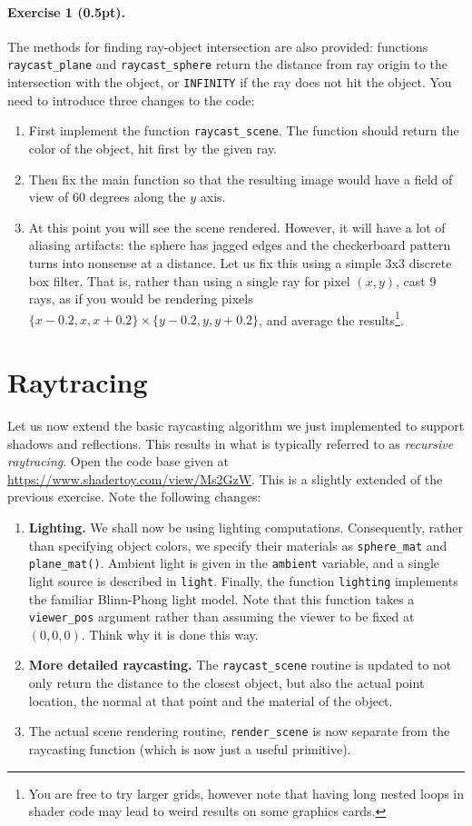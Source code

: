 \documentclass{article}
\newenvironment{exercise}[2]{\paragraph{Exercise #1 (#2pt).} }{
\medskip}
\begin{document}
\begin{exercise}{1}{0.5}
The methods for finding ray-object intersection are also provided: functions \verb#raycast_plane# and \verb#raycast_sphere# return the distance from ray origin to the intersection with the object, or \verb#INFINITY# if the ray does not hit the object. You need to introduce three changes to the code:
\begin{enumerate}
\item First implement the function \verb#raycast_scene#. The function should return the color of the object, hit first by the given ray.
\item Then fix the main function so that the resulting image would have a field of view of 60 degrees along the $y$ axis.
\item At this point you will see the scene rendered. However, it will have a lot of aliasing artifacts: the sphere has jagged edges and the checkerboard pattern turns into nonsense at a distance. Let us fix this using a simple 3x3 discrete box filter. That is, rather than using a single ray for pixel $(x,y)$, cast 9 rays, as if you would be rendering pixels $\{x-0.2, x, x+0.2\}\times\{y-0.2, y, y+0.2\}$, and average the results\footnote{You are free to try larger grids, however note that having long nested loops in shader code may lead to weird results on some graphics cards.}. 
\end{enumerate}
\end{exercise}

\section{Raytracing}
Let us now extend the basic raycasting algorithm we just implemented to support shadows and reflections. This results in what is typically referred to as \emph{recursive raytracing}. Open the code base given at \url{https://www.shadertoy.com/view/Ms2GzW}. This is a slightly extended of the previous exercise. Note the following changes:
\begin{enumerate}
\item \textbf{Lighting.}  We shall now be using lighting computations. Consequently, rather than specifying object colors, we specify their materials as \verb#sphere_mat# and \verb#plane_mat()#. Ambient light is given in the \verb#ambient# variable, and a single light source is described in \verb#light#.
Finally, the function \verb#lighting# implements the familiar Blinn-Phong light model. Note that this function takes a \verb#viewer_pos# argument rather than assuming the viewer to be fixed at $(0, 0, 0)$. Think why it is done this way.
\item \textbf{More detailed raycasting.} The \verb#raycast_scene# routine is updated to not only return the distance to the closest object, but also the actual point location, the normal at that point and the material of the object.
\item The actual scene rendering routine, \verb#render_scene# is now separate from the raycasting function (which is now just a useful primitive).
\end{enumerate}
\end{document}
